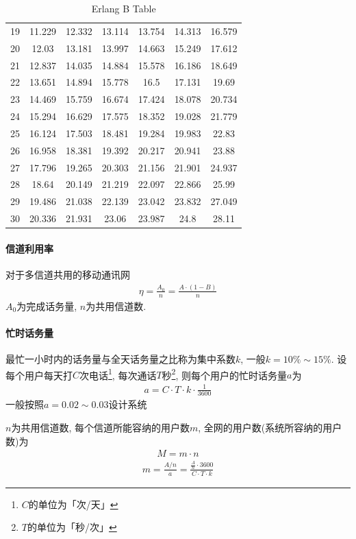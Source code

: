 \documentclass[a4paper]{report}
\begin{document}
\begin{table}[htbp]
\begin{tabular}{ccccccc}
    19    & 11.229 & 12.332 & 13.114 & 13.754 & 14.313 & 16.579 \\
    20    & 12.03 & 13.181 & 13.997 & 14.663 & 15.249 & 17.612 \\
    21    & 12.837 & 14.035 & 14.884 & 15.578 & 16.186 & 18.649 \\
    22    & 13.651 & 14.894 & 15.778 & 16.5  & 17.131 & 19.69 \\
    23    & 14.469 & 15.759 & 16.674 & 17.424 & 18.078 & 20.734 \\
    24    & 15.294 & 16.629 & 17.575 & 18.352 & 19.028 & 21.779 \\
    25    & 16.124 & 17.503 & 18.481 & 19.284 & 19.983 & 22.83 \\
    26    & 16.958 & 18.381 & 19.392 & 20.217 & 20.941 & 23.88 \\
    27    & 17.796 & 19.265 & 20.303 & 21.156 & 21.901 & 24.937 \\
    28    & 18.64 & 20.149 & 21.219 & 22.097 & 22.866 & 25.99 \\
    29    & 19.486 & 21.038 & 22.139 & 23.042 & 23.832 & 27.049 \\
    30    & 20.336 & 21.931 & 23.06 & 23.987 & 24.8  & 28.11 \\
    \hline
    \end{tabular}%
  \caption{Erlang B Table}
  \label{tab:erlang_b}%
\end{table}%


\paragraph{信道利用率} 对于多信道共用的移动通讯网
\begin{align*}
	\eta = \frac{A_0}{n}=\frac{A\cdot (1-B)}{n}
\end{align*}
$A_0$为完成话务量, $n$为共用信道数. 


\paragraph{忙时话务量} 最忙一小时内的话务量与全天话务量之比称为集中系数$k$, 一般$k=10\%\sim 15\%$.
设每个用户每天打$C$次电话\footnote{$C$的单位为「次/天」}, 每次通话$T$秒\footnote{$T$的单位为「秒/次」}, 则每个用户的忙时话务量$a$为
\begin{align*}
	a = C\cdot T\cdot k\cdot \frac{1}{3600}
\end{align*}
一般按照$a = 0.02\sim 0.03$设计系统

$n$为共用信道数, 每个信道所能容纳的用户数$m$, 全网的用户数(系统所容纳的用户数)为
\begin{align*}
	M = m\cdot n
\end{align*}
\begin{align*}
	m=\frac{A/n}{a}=\frac{\frac{A}{n}\cdot 3600}{C\cdot T\cdot k}
\end{align*}
\end{document}
